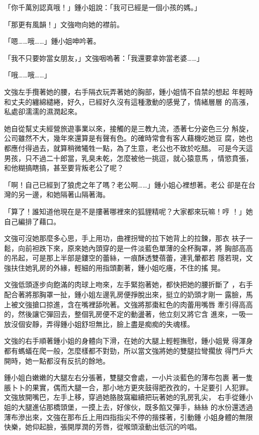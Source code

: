 「你千萬別認真哦！」鍾小姐說：「我可已經是一個小孩的媽。」

「那更有風韻！」文強吻向她的襟前。

「嗯……哦……」鍾小姐呻吟著。

「我不只要妳當女朋友，」文強咽嗚著：「我還要拿妳當老婆……」

「哦……哦……」

文強左手攬著她的腰，右手隔衣玩弄著她的胸部，鍾小姐情不自禁的想起
年輕時和丈夫的纏綿繾綣，好久，已經好久沒有這種激動的感覺了，情緒層層
的高漲，私處卻濡濡的濕潤起來。

她自從幫丈夫經營旅遊事業以來，接觸的是三教九流，憑著七分姿色三分
斛旋，公司雖然不大，幾年來還算是有聲有色。的確時常會有客人藉機吃她豆
腐，她也都應付得過去，就算稍微犧牲一點，為了生意，老公也不致於吃醋。
可是今天這男孩，只不過二十郎當，乳臭未乾，怎麼被他一挑逗，就心猿意馬
，情慾賁張，和他糊搞瞎搞，甚至要背叛老公了呢？

「啊！自己已經到了狼虎之年了嗎？老公啊……」鍾小姐心裡想著。老公
卻是在台灣的另一邊，和她隔著山隔著海。

「算了！誰知道他現在是不是摟著哪裡來的狐貍精呢？大家都來玩嘛！哼
！」她自己編排了藉口。

文強可沒她那麼多心思，手上用功，曲裡拐彎的拉下她背上的拉鍊，那衣
衭子一鬆，向前袒跌下來，原來她內頭穿的是一件淡藍色單薄的全杯胸罩，將
胸部高高的吊起，可是那上半部是鏤空的蕾絲，一痕酥透雙蓓蕾，連乳暈都若
隱若現，文強扶住她乳房的外緣，輕細的用指頭劃著，鍾小姐吃癢，不住的搖
晃。

文強低頭逐步向飽滿的肉球上吻來，左手緊抱著她，都快把她的腰折斷了
，右手配合著將那胸罩一扯，鍾小姐左邊乳房便掙脫出來，挺立的奶頭才剛一
露臉，馬上被文強搶口掠進，含在嘴裡舔吮著。文強將那棗紅色的肉蕾用嘴唇
牽引得高高的，然後讓它彈回去，整個乳房便不定的動盪著，他立刻又將它含
進來，一吸一放沒個安靜，弄得鍾小姐舒坦無比，臉上盡是痴痴的失魂樣。

文強的右手順著鍾小姐的身體向下滑，在她的大腿上輕輕撫慰，鍾小姐覺
得渾身都有螞蟻在爬一般，怎麼樣都不對勁，所以當文強將她的雙腿拉彎擱放
得門戶大開時，她一點都沒有反抗的餘地。

鍾小姐白嫩嫩的大腿左右分張著，雙腿交會處，一小片淡藍色的薄布包裹
著一隻脹卜卜的果實，偶而大腿一合，那小地方更夾鼓得肥孜孜的，十足要引
人犯罪。文強放開嘴巴，左手上移，穿過她胳肢窩繼續把玩著她的乳房乳尖，
右手從鍾小姐的大腿進佔那橋頭堡，一摸上去，好傢伙，既多餡又彈手，絲絲
的水份還透過薄布滲出來，文強在那布丘上用四指指尖不停的揩搽著，引動鍾
小姐身體的無限快樂，她仰起臉，張開厚潤的芳唇，從喉頭滾動出低沉的吟唱。

